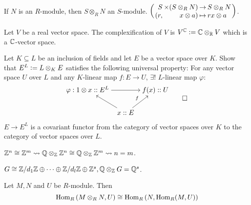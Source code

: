 If $N$ is an $R$-module, then $S \otimes_R N$ an $S$-module.
    $\arraycolsep=1pt
    \left(\begin{array}{rrcl}
      S & \times (S \otimes_R N) & \to & S \otimes_R N \\
      (r, & x\otimes a) & \mapsto & rx \otimes a
    \end{array}\right)$.

\begin{example}
  Let $V$ be a real vector space. The complexification of $V$ is
  $V^{\mathbb{C}} \vcentcolon= \mathbb{C} \otimes_{\mathbb{R}} V$ which is a $\mathbb{C}$-vector space.
\end{example}

\begin{exercise}
  Let $K \subseteq L$ be an inclusion of fields and let $E$ be a vector space
  over $K$. Show that $E^L \vcentcolon= L \otimes_K E$ satisfies the following
  universal property: For any vector space $U$ over $L$ and any
  $K$-linear map $f: E \to U$, $\exists!$ $L$-linear map $\varphi$:
  \[
    \begin{tikzcd}[cramped, column sep=tiny]
      \varphi: 1\otimes x :: E^L \arrow{rr} & & f(x) :: U \\
      & x :: E \arrow{ul} \arrow{ur}{f} &
    \end{tikzcd}
    \qedhere
  \]
\end{exercise}

\begin{exercise}
  $E \to E^L$ is a covariant functor from the category of vector spaces over
  $K$ to the category of vector spaces over $L$.
\end{exercise}

\begin{example}
  $\mathbb{Z}^n \cong \mathbb{Z}^m \leadsto
  \mathbb{Q} \otimes_{\mathbb{Z}} \mathbb{Z}^n \cong \mathbb{Q} \otimes_{\mathbb{Z}} \mathbb{Z}^m \leadsto n = m$.
\end{example}

\begin{example}
  $G \cong {\mathbb{Z}}/{d_1\mathbb{Z}} \oplus \dots \oplus {\mathbb{Z}}/{d_l\mathbb{Z}}
  \oplus \mathbb{Z}^s, \mathbb{Q} \otimes_{\mathbb{Z}} G = \mathbb{Q}^s$.
\end{example}

Let $M, N$ and $U$ be $R$-module. Then
\[
  \operatorname{Hom}_R\left(M \otimes_R N, U\right) \cong
  \operatorname{Hom}_R\left(N, \operatorname{Hom}_R(M, U)\right)
\]

